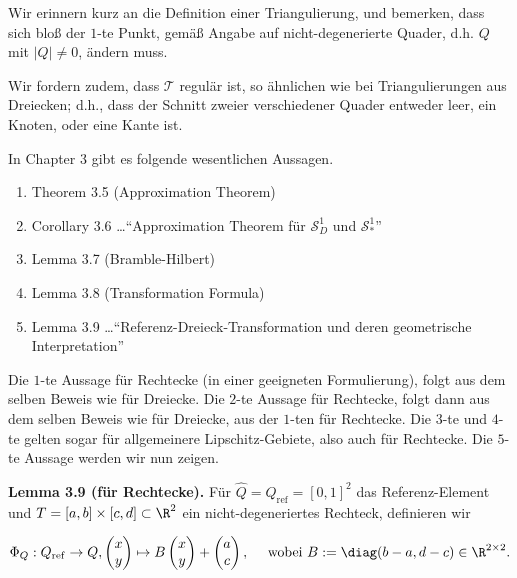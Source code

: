 \begin{solution}

Wir erinnern kurz an die Definition einer Triangulierung, und bemerken, dass sich bloß der $1$-te Punkt, gemäß Angabe auf nicht-degenerierte Quader, d.h. $Q$ mit $|Q| \neq 0$, ändern muss.


Wir fordern zudem, dass $\mathcal{T}$ regulär ist, so ähnlichen wie bei Triangulierungen aus Dreiecken;
d.h., dass der Schnitt zweier verschiedener Quader entweder leer, ein Knoten, oder eine Kante ist.

In Chapter 3 gibt es folgende wesentlichen Aussagen.

\begin{enumerate}[label = \arabic*]
  \item Theorem 3.5 (Approximation Theorem)
  \item Corollary 3.6 \dots \enquote{Approximation Theorem für $\mathcal{S}_D^1$ und $\mathcal{S}_\ast^1$}
  \item Lemma 3.7 (Bramble-Hilbert)
  \item Lemma 3.8 (Transformation Formula)
  \item Lemma 3.9 \dots \enquote{Referenz-Dreieck-Transformation und deren geometrische Interpretation}
\end{enumerate}

Die $1$-te Aussage für Rechtecke (in einer geeigneten Formulierung), folgt aus dem selben Beweis wie für Dreiecke.
Die $2$-te Aussage für Rechtecke, folgt dann aus dem selben Beweis wie für Dreiecke, aus der $1$-ten für Rechtecke.
Die $3$-te und $4$-te gelten sogar für allgemeinere Lipschitz-Gebiete, also auch für Rechtecke.
Die $5$-te Aussage werden wir nun zeigen.

\begin{tcolorbox}[standard jigsaw, opacityback = 0]

  \textbf{Lemma 3.9 (für Rechtecke).}
  Für $\hat Q = Q_\mathrm{ref} = [0, 1]^2$ das Referenz-Element und $T = [a, b] \times [c, d] \subset \R^2$ ein nicht-degeneriertes Rechteck, definieren wir

  \begin{align*}
    \Phi_Q:
    Q_\mathrm{ref} \to Q,
    \begin{pmatrix}
      x \\ y
    \end{pmatrix}
    \mapsto
    B
    \begin{pmatrix}
      x \\ y
    \end{pmatrix}
    +
    \begin{pmatrix}
      a \\ c
    \end{pmatrix},
    \quad
    ~\text{wobei}~
    B := \diag(b - a, d - c) \in \R^{2 \times 2}.
  \end{align*}


\end{tcolorbox}
\end{solution}
